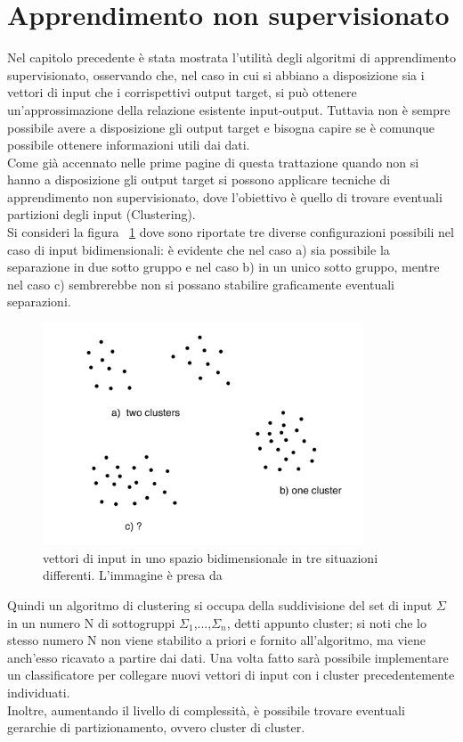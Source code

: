 \section{Apprendimento non supervisionato}
\label{app_non_sup}

Nel capitolo precedente è stata mostrata l'utilità degli algoritmi di apprendimento supervisionato, osservando che, nel caso in cui si abbiano a disposizione sia i vettori di input che i corrispettivi output target, si può ottenere un'approssimazione della relazione esistente input-output.
Tuttavia non è sempre possibile avere a disposizione gli output target e bisogna capire se è comunque possibile ottenere informazioni utili dai dati. \\
Come già accennato nelle prime pagine di questa trattazione quando non si hanno a disposizione gli output target si possono applicare tecniche di apprendimento non supervisionato, dove l'obiettivo è quello di trovare eventuali partizioni degli input (Clustering). \\
Si consideri la figura ~\ref{Unsup} dove sono riportate tre diverse configurazioni possibili nel caso di input bidimensionali: è evidente che nel caso a) sia possibile la separazione in due sotto gruppo e nel caso b) in un unico sotto gruppo, mentre nel caso c) sembrerebbe non si possano stabilire graficamente eventuali separazioni.

\begin{figure}[h!]
	\centering
	\includegraphics[width=0.85\textwidth]{figs/Unsup_learning.png}
	\caption{vettori di input in uno spazio bidimensionale in tre situazioni differenti. L'immagine è presa da \cite{IntroML}}
	\label{Unsup}
\end{figure}

Quindi un algoritmo di clustering si occupa della suddivisione del set di input $\Sigma$ in un numero N di sottogruppi $\Sigma_1$,...,$\Sigma_n$, detti appunto cluster; si noti che lo stesso numero N non viene stabilito a priori e fornito all'algoritmo, ma viene anch'esso ricavato a partire dai dati. Una volta fatto sarà possibile implementare un classificatore per collegare nuovi vettori di input con i cluster precedentemente individuati.\\
Inoltre, aumentando il livello di complessità, è possibile trovare eventuali gerarchie di partizionamento, ovvero cluster di cluster.

